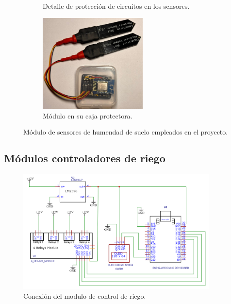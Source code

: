 \begin{figure}[!htpb]
\begin{subfigure}[b]{0.45\textwidth}
		\caption[Detalle de protección de circuitos en los sensores]{Detalle de protección de circuitos en los sensores.}
     \end{subfigure}	
			\begin{subfigure}[b]{0.45\textwidth}
	\centering
		\includegraphics[width=0.60\textwidth]{./Figures/soil3.jpg}
		\caption[Módulo en su caja protectora]{Módulo en su caja protectora.}
		\label{fig:soil3}
     \end{subfigure}
     \hfill
        \caption[Módulos de sensores de humendad de suelo  empleados en el proyecto]{Módulo de sensores de humendad de suelo  empleados en el proyecto.}
        \label{fig:soilsenors}
\end{figure}



\subsection{Módulos controladores de riego}
\label{Módulos controladores de riego}

\begin{figure}[!h]
	\centering
	\includegraphics[width=0.9\textwidth]{./Figures/pump_schem.png}
	\caption[Conexión del modulo de control de riego]{Conexión del modulo de control de riego.}
	\label{fig:riegochem}
\end{figure}



